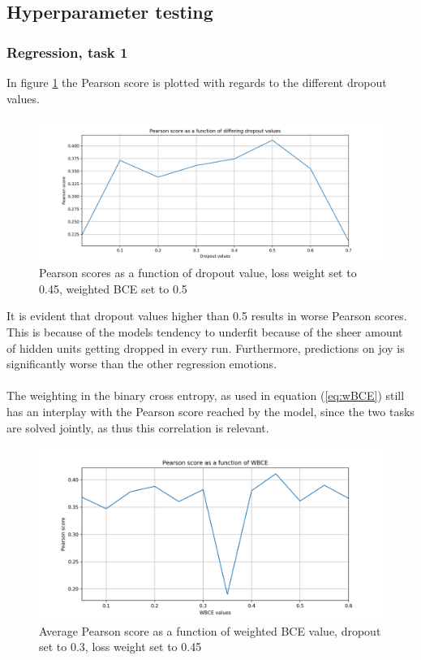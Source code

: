 \subsection{Hyperparameter testing}
\subsubsection{Regression, task 1}
In figure \ref{fig:averagedropout} the Pearson score is plotted with regards to the different dropout values.
\begin{figure}[H]
    \centering
        \includegraphics[width=\textwidth]{pictures/DropoutPlot.png}
        \caption{Pearson scores as a function of dropout value, loss weight set to 0.45, weighted BCE set to 0.5}
        \label{fig:averagedropout}
\end{figure}
It is evident that dropout values higher than 0.5 results in worse Pearson scores. This is because of the models tendency to underfit because of the sheer amount of hidden units getting dropped in every run. Furthermore, predictions on joy is significantly worse than the other regression emotions.\\
\\
The weighting in the binary cross entropy, as used in equation (\ref{eq:wBCE}) still has an interplay with the Pearson score reached by the model, since the two tasks are solved jointly, as thus this correlation is relevant.
\begin{figure}[H]
    \centering
        \includegraphics[width=\textwidth]{pictures/weightedBCEplot.png}
        \caption{Average Pearson score as a function of weighted BCE value, dropout set to 0.3, loss weight set to 0.45}
        \label{fig:averageBCE}
\end{figure}
